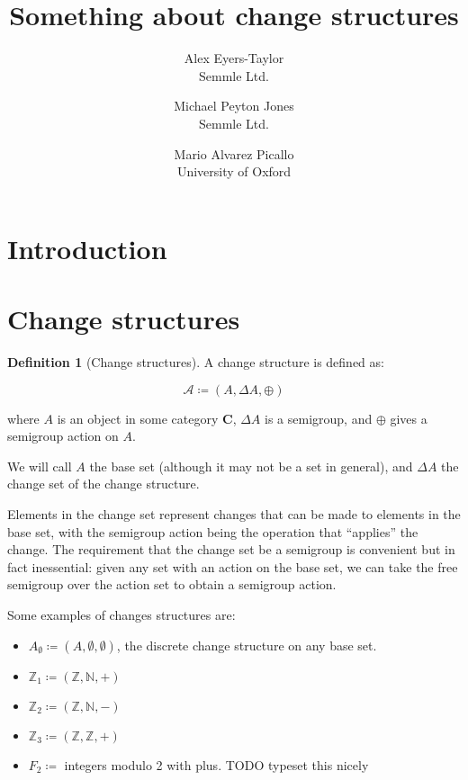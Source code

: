 \documentclass[english]{article}
\theoremstyle{plain}
\theoremstyle{definition}
\theoremstyle{remark}
\theoremstyle{remark}
\theoremstyle{remark}
\theoremstyle{definition}
\newtheorem{defn}{Definition}
\newcommand{\defeq}{\coloneqq}
\newcommand{\cat}[1]{\mathbf{#1}}
\newcommand{\cplus}{\oplus}
\newcommand{\cstruct}[3]{(#1,#2,#3)}
\newcommand{\changes}[1]{\Delta #1}
\newcommand{\discrete}{\emptyset}
\begin{document}
\title{Something about change structures}

\author{
  Alex Eyers-Taylor\\
  Semmle Ltd.
  \and
  Michael Peyton Jones\\
  Semmle Ltd.
  \and
  Mario Alvarez Picallo\\
  University of Oxford
}

\maketitle

\section{Introduction}

\section{Change structures}

\begin{defn}[Change structures]
  A change structure is defined as:

  $$\mathcal{A} \defeq \cstruct{A}{\changes{A}}{\cplus}$$

  where $A$ is an object in some category $\cat{C}$, $\changes{A}$ is a semigroup, and $\cplus$ gives a semigroup action on $A$.

  We will call $A$ the base set (although it may not be a set in general), and $\changes{A}$ the change set of the change structure.
\end{defn}

Elements in the change set represent changes that can be made to elements in the
base set, with the semigroup action being the operation that ``applies'' the
change. The requirement that the change set be a semigroup is convenient but in
fact inessential: given any set with an action on the base set, we can take the
free semigroup over the action set to obtain a semigroup action.

Some examples of changes structures are:
\begin{itemize}
  \item $A_\discrete \defeq \cstruct{A}{\emptyset}{\emptyset}$, the discrete
    change structure on any base set.
  \item $\mathbb{Z}_1 \defeq \cstruct{\mathbb{Z}}{\mathbb{N}}{+}$
  \item $\mathbb{Z}_2 \defeq \cstruct{\mathbb{Z}}{\mathbb{N}}{-}$
  \item $\mathbb{Z}_3 \defeq \cstruct{\mathbb{Z}}{\mathbb{Z}}{+}$
  \item $F_2 \defeq$ integers modulo 2 with plus. TODO typeset this nicely
\end{itemize}
\end{document}
